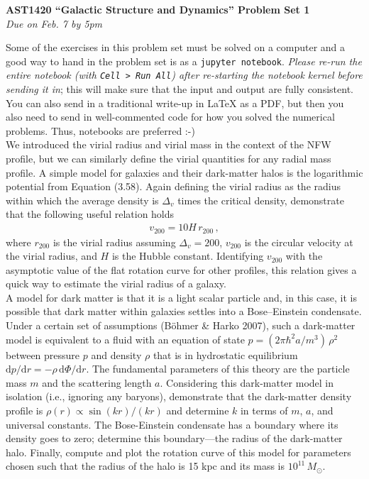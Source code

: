 \documentclass[12pt]{article}
\begin{document}
\begin{center}
{\bf \LARGE AST1420 ``Galactic Structure and Dynamics'' Problem Set 1}\\[7pt]
\emph{Due on Feb. 7 by 5pm}\\[7pt]
\end{center}

Some of the exercises in this problem set must be solved on a computer
and a good way to hand in the problem set is as a \texttt{jupyter
  notebook}. \emph{Please re-run the entire notebook (with \texttt{Cell
    > Run All}) after re-starting the notebook kernel before sending
  it in}; this will make sure that the input and output are fully
consistent. You can also send in a traditional write-up in LaTeX as a PDF, 
but then you also need to send in well-commented code for how you solved 
the numerical problems. Thus, notebooks are preferred :-)\\

 We introduced the virial radius and virial mass 
in the context of the NFW profile, but we can similarly define the virial 
quantities for any radial mass profile. A simple model for galaxies and 
their dark-matter halos is the logarithmic potential from 
Equation (3.58). Again defining the virial 
radius as the radius within which the average density is \(\Delta_v\) 
times the critical density, demonstrate that the following useful relation 
holds
\begin{equation*}
\begin{split}v_{200} = 10H\,r_{200}\,,\end{split}
\end{equation*}
where \(r_{200}\) is the virial radius assuming \(\Delta_v = 200\), \(v_{200}\) is 
the circular velocity at the virial radius, and \(H\) is the Hubble constant. 
Identifying \(v_{200}\) with the asymptotic value of the flat rotation curve for 
other profiles, this relation gives a quick way to estimate the virial radius of a 
galaxy.\\

 A model for dark matter is that it is a light scalar 
particle and, in this case, it is possible that dark matter within galaxies settles 
into a Bose--Einstein condensate. Under a certain set of assumptions 
(B\"{o}hmer \& Harko 2007), such a dark-matter model is equivalent to a fluid with an 
equation of state \(p = (2\pi \hbar^2 a/m^3)\,\rho^2\) between pressure 
\(p\) and density \(\rho\) that is in hydrostatic equilibrium 
\(\mathrm{d} p / \mathrm{d} r = -\rho\,\mathrm{d} \Phi / \mathrm{d} r\). The 
fundamental parameters of this theory are the particle mass \(m\) and the scattering 
length \(a\). Considering this dark-matter model in isolation 
(i.e., ignoring any baryons), demonstrate that the dark-matter density profile is 
\(\rho(r) \propto \sin(kr)/(kr)\) and determine \(k\) in terms of \(m\), \(a\), and 
universal constants. The Bose-Einstein condensate has a boundary where 
its density goes to zero; determine this boundary—the radius of the dark-matter halo. 
Finally, compute and plot the rotation curve of this model for parameters chosen such 
that the radius of the halo is 15 kpc and its mass is \(10^{11}\,M_\odot\).\\
\end{document}
